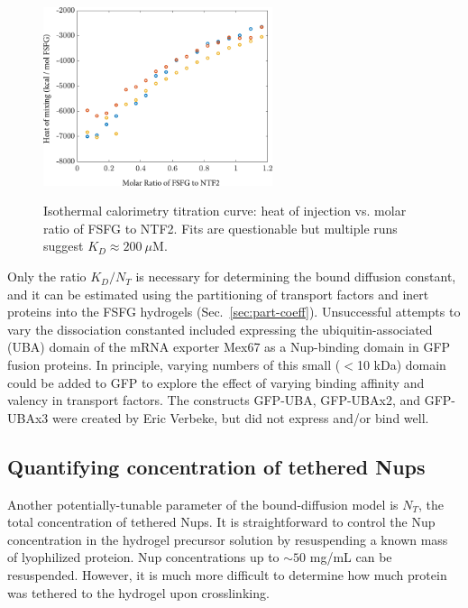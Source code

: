 \begin{figure}
\caption[Isothermal titration calorimetry with NTF2 and FSFG.]{Isothermal calorimetry titration curve: heat of injection vs. molar ratio of FSFG to NTF2. Fits are questionable but multiple runs suggest $K_D \approx 200\ \mu$M.}
\centering
\includegraphics[width=0.6\textwidth]{figs/ch04/ITC_runs}
\label{fig:ITC-runs}
\end{figure} 

Only the ratio $K_D/N_T$ is necessary for determining the bound diffusion constant, and it can be estimated using the partitioning of transport factors and inert proteins into the FSFG hydrogels (Sec.~\ref{sec:part-coeff}).  Unsuccessful attempts to vary the dissociation constanted included expressing the ubiquitin-associated (UBA) domain of the mRNA exporter Mex67 as a Nup-binding domain in GFP fusion proteins.  In principle, varying numbers of this small ($<$10 kDa) domain could be added to GFP to explore the effect of varying binding affinity and valency in transport factors.  The constructs GFP-UBA, GFP-UBAx2, and GFP-UBAx3 were created by Eric Verbeke, but did not express and/or bind well.


\subsection{Quantifying concentration of tethered Nups}

Another potentially-tunable parameter of the bound-diffusion model is $N_T$, the total concentration of tethered Nups.  It is straightforward to control the Nup concentration in the hydrogel precursor solution by resuspending a known mass of lyophilized proteion.  Nup concentrations up to $\sim 50$ mg/mL can be resuspended.  However, it is much more difficult to determine how much protein was tethered to the hydrogel upon crosslinking. 


